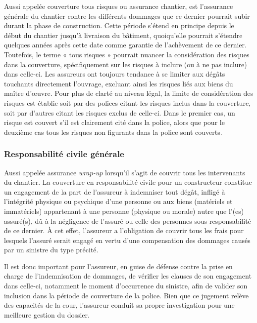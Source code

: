 \documentclass[11pt]{article}
\begin{document}
Aussi appelée couverture tous risques ou assurance chantier, est l'assurance générale du chantier contre les différents dommages que ce dernier pourrait subir durant la phase de construction. Cette période s'étend en principe depuis le début du chantier jusqu'à livraison du bâtiment, quoiqu'elle pourrait s'étendre quelques années après cette date comme garantie de l'achèvement de ce dernier. Toutefois, le terme « tous risques » pourrait nuancer la considération des risques dans la couverture, spécifiquement sur les risques à inclure (ou à ne pas inclure) dans celle-ci. Les assureurs ont toujours tendance à se limiter aux dégâts touchants directement l'ouvrage, excluant ainsi les risques liés aux biens du maître d'œuvre. Pour plus de clarté au niveau légal, la limite de considération des risques est établie soit par des polices citant les risques inclus dans la couverture, soit par d'autres citant les risques exclus de celle-ci. Dans le premier cas, un risque est couvert s'il est clairement cité dans la police, alors que pour le deuxième cas tous les risques non figurants dans la police sont couverts.

\subsubsection{Responsabilité civile générale}

Aussi appelée assurance \textit{wrap-up} lorsqu'il s'agit de couvrir tous les intervenants du chantier. La couverture en responsabilité civile pour un constructeur constitue un engagement de la part de l'assureur à indemniser tout dégât, infligé à l'intégrité physique ou psychique d'une personne ou aux biens (matériels et immatériels) appartenant à une personne (physique ou morale) autre que l'(es) assuré(s), dû à la négligence de l'assuré ou celle des personnes sous responsabilité de ce dernier. À cet effet, l'assureur a l'obligation de couvrir tous les frais pour lesquels l'assuré serait engagé en vertu d'une compensation des dommages causés par un sinistre du type précité.

Il est donc important pour l'assureur, en guise de défense contre la prise en charge de l'indemnisation de dommages, de vérifier les clauses de son engagement dans celle-ci, notamment le moment d'occurrence du sinistre, afin de valider son inclusion dans la période de couverture de la police. Bien que ce jugement relève des capacités de la cour, l'assureur conduit sa propre investigation pour une meilleure gestion du dossier.
\end{document}

